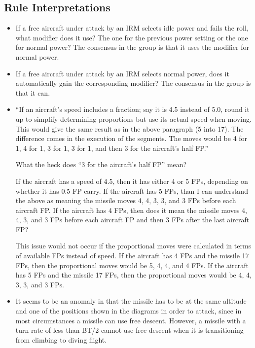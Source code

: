 \documentclass[10pt]{report}
\begin{document}
\subsection{Rule Interpretations}

\begin{itemize}

\item If a free aircraft under attack by an IRM selects idle power and fails the roll, what modifier does it use? The one for the previous power setting or the one for normal power? The consensus in the group is that it uses the modifier for normal power.

\item If a free aircraft under attack by an IRM selects normal power, does it automatically gain the corresponding modifier? The consensus in the group is that it can.

\item “If an aircraft's speed includes a fraction; say it is 4.5 instead of 5.0, round it up to simplify determining proportions but use its actual speed when moving. This would give the same result as in the above paragraph (5 into 17). The difference comes in the execution of the segments. The moves would be 4 for 1, 4 for 1, 3 for 1, 3 for 1, and then 3 for the aircraft's half FP.”

What the heck does “3 for the aircraft's half FP” mean?

If the aircraft has a speed of 4.5, then it has either 4 or 5 FPs, depending on whether it has 0.5 FP carry. If the aircraft has 5 FPs, than I can understand the above as meaning the missile moves 4, 4, 3, 3, and 3 FPs before each aircraft FP. If the aircraft has 4 FPs, then does it mean the missile moves 4, 4, 3, and 3 FPs before each aircraft FP and then 3 FPs after the last aircraft FP?

This issue would not occur if the proportional moves were calculated in terms of available FPs instead of speed. If the aircraft has 4 FPs and the missile 17 FPs, then the proportional moves would be 5, 4, 4, and 4 FPs. If the aircraft has 5 FPs and the missile 17 FPs, then the proportional moves would be 4, 4, 3, 3, and 3 FPs.

\item It seems to be an anomaly in that the missile has to be at the same altitude and one of the positions shown in the diagrams in order to attack, since in most circumstances a missile can use free descent. However, a missile with a turn rate of less than BT/2 cannot use free descent when it is transitioning from climbing to diving flight. 


\end{itemize}
\end{document}
